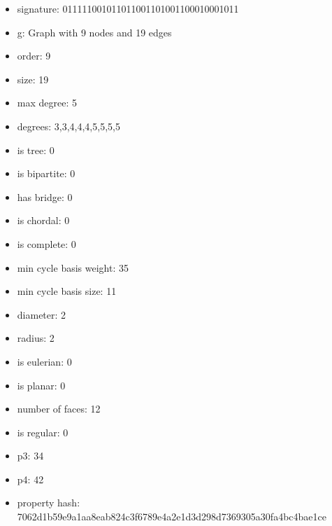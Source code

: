 \newpage
\begin{figure}
\end{figure}
\begin{itemize}
\item signature: 011111001011011001101001100010001011
\item g: Graph with 9 nodes and 19 edges
\item order: 9
\item size: 19
\item max degree: 5
\item degrees: 3,3,4,4,4,5,5,5,5
\item is tree: 0
\item is bipartite: 0
\item has bridge: 0
\item is chordal: 0
\item is complete: 0
\item min cycle basis weight: 35
\item min cycle basis size: 11
\item diameter: 2
\item radius: 2
\item is eulerian: 0
\item is planar: 0
\item number of faces: 12
\item is regular: 0
\item p3: 34
\item p4: 42
\item property hash: 7062d1b59e9a1aa8eab824c3f6789e4a2e1d3d298d7369305a30fa4bc4bae1ce
\end{itemize}
